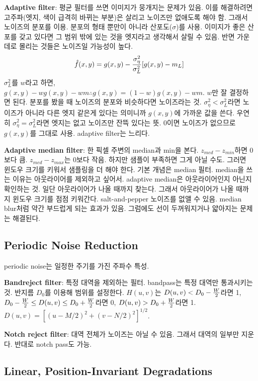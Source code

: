 \textbf{Adaptive filter}: 평균 필터를 쓰면 이미지가 뭉개지는 문제가 있음. 이를 해결하려면 고주파(엣지, 색이 급격히 바뀌는 부분)은 살리고 노이즈만 없애도록 해야 함. 그래서 노이즈의 분포를 이용. 분포의 형태 뿐만이 아니라 산포도($\sigma$)를 사용. 이미지가 좋은 산포를 갖고 있다면 그 범위 밖에 있는 것을 엣지라고 생각해서 살릴 수 있음. 반면 가운데로 몰리는 것들은 노이즈일 가능성이 높다.
$$\hat{f}(x, y) = g(x, y) - {\sigma_\eta^2 \over \sigma_L^2}[g(x, y) - m_L]$$
$\sigma_L^2$를 $w$라고 하면, $g(x, y) - wg(x, y) - wm \therefore g(x, y) = (1 - w) g(x, y) - wm$. $w$만 잘 결정하면 된다. 분포를 봤을 때 노이즈의 분포와 비슷하다면 노이즈라는 것. $\sigma_\eta^2 < \sigma_L^2$라면 노이즈가 아니라 다른 엣지 같은게 있다는 의미니까 $g(x, y)$에 가까운 값을 쓴다. 우연히 $\sigma_\eta^2 = \sigma_L^2$라면 엣지는 없고 노이즈만 잔뜩 있다는 뜻. 0이면 노이즈가 없으므로 $g(x, y)$를 그대로 사용. adaptive filter는 느리다.

\textbf{Adaptive median filter}: 한 픽셀 주변의 median과 min을 본다. $z_{med} - z_{min}$하면 0보다 큼. $z_{med} - z_{max}$는 0보다 작음. 하지만 샘플이 부족하면 그게 아닐 수도. 그러면 윈도우 크기를 키워서 샘플링을 더 해야 한다. 기본 개념은 median 필터. median을 쓰는 이유는 아웃라이어를 제외하고 싶어서. adaptive median은 아웃라이어인지 아닌지 확인하는 것. 일단 아웃라이어가 나올 때까지 찾는다. 그래서 아웃라이어가 나올 때까지 윈도우 크기를 점점 키워간다. salt-and-pepper 노이즈를 없앨 수 있음. median blur처럼 약간 부드럽게 되는 효과가 있음. 그럼에도 선이 두꺼워지거나 얇아지는 문제는 해결된다.

\subsection{Periodic Noise Reduction}

periodic noise는 일정한 주기를 가진 주파수 특성.

\textbf{Bandreject filter}: 특정 대역을 제외하는 필터. bandpass는 특정 대역만 통과시키는 것. 반지름 $D_0$를 이용해 범위를 설정한다. $H(u, v)$는 $D(u, v) < D_0 - {W \over 2}$라면 1, $D_0 - {W \over 2} \leq D(u, v) \leq D_0 + {W \over 2}$라면 0, $D(u, v) > D_0 + {W \over 2}$라면 1. $D(u, v) = [(u - M / 2)^2 + (v - N / 2)^2]^{1/2}$.

\textbf{Notch reject filter}: 대역 전체가 노이즈는 아닐 수 있음. 그래서 대역의 일부만 지운다. 반대로 notch pass도 가능.

\subsection{Linear, Position-Invariant Degradations}

